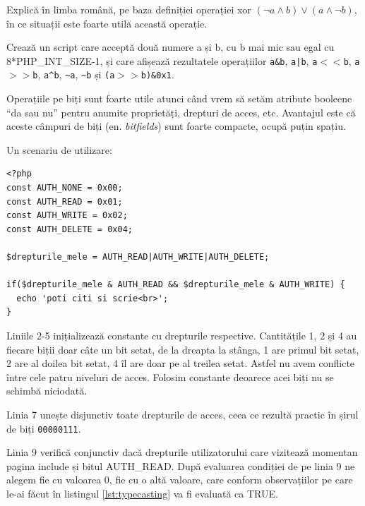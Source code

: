\begin{Exercise}[title={Jonglează cu expresii boolene},difficulty=3]
Explică în limba română, pe baza definiției operației xor
$(\lnot a \land b) \lor (a \land \lnot b)$,
în ce situații este foarte utilă această operație.
\end{Exercise}


\begin{Exercise}[title={Operații pe biți}]
Crează un script care acceptă două numere a și b, cu b mai mic sau egal cu 8*PHP\_INT\_SIZE-1, și
care afișează rezultatele operațiilor \texttt{a\&b}, \texttt{a|b}, \texttt{a$<<$b},
\texttt{a$>>$b}, \texttt{a{\textasciicircum}b},
\texttt{{\~{}}a}, \texttt{{\~{}}b} și \texttt{(a$>>$b)\&0x1}.
\end{Exercise}

Operațiile pe biți sunt foarte utile atunci când vrem să setăm atribute booleene ``da sau nu''
pentru anumite proprietăți, drepturi de acces, etc. Avantajul este că aceste câmpuri de biți
(en. \textsl{bitfields}) sunt foarte compacte, ocupă puțin spațiu.

Un scenariu de utilizare:
\begin{lstlisting}
<?php
const AUTH_NONE = 0x00;
const AUTH_READ = 0x01;
const AUTH_WRITE = 0x02;
const AUTH_DELETE = 0x04;

$drepturile_mele = AUTH_READ|AUTH_WRITE|AUTH_DELETE;

if($drepturile_mele & AUTH_READ && $drepturile_mele & AUTH_WRITE) {
  echo 'poti citi si scrie<br>';
}
\end{lstlisting}
Liniile 2-5 inițializează constante cu drepturile respective.  Cantitățile 1, 2 și 4
au fiecare biții doar câte un bit setat, de la dreapta la stânga, 1 are primul bit setat,
2 are al doilea bit setat, 4 îl are doar pe al treilea setat. Astfel nu avem conflicte
între cele patru niveluri de acces. Folosim constante
deoarece acei biți nu se schimbă niciodată.

Linia 7 unește disjunctiv toate drepturile de acces, ceea ce rezultă practic în șirul
de biți \texttt{00000111}.

Linia 9 verifică conjunctiv dacă drepturile utilizatorului care vizitează
momentan pagina include și bitul AUTH\_READ. După evaluarea condiției
de pe linia 9 ne alegem fie cu valoarea 0, fie cu o altă valoare,
care conform observațiilor pe care le-ai făcut în listingul \ref{lst:typecasting}
va fi evaluată ca TRUE.

